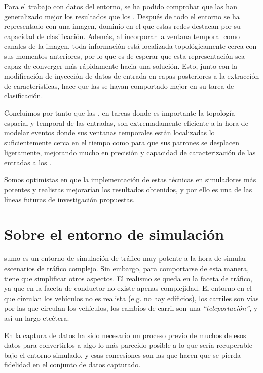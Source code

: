 Para el trabajo con datos del entorno, se ha podido comprobar que las  han generalizado mejor los resultados que los . Después de todo el entorno se ha representado con una imagen, dominio en el que estas redes destacan por su capacidad de clasificación. Además, al incorporar la ventana temporal como canales de la imagen, toda información está localizada topológicamente cerca con sus momentos anteriores, por lo que es de esperar que esta representación sea capaz de converger más rápidamente hacia una solución. Esto, junto con la modificación de inyección de datos de entrada en capas posteriores a la extracción de características, hace que las  se hayan comportado mejor en su tarea de clasificación.

Concluimos por tanto que las , en tareas donde es importante la topología espacial y temporal de las entradas, son extremadamente eficiente a la hora de modelar eventos donde sus ventanas temporales están localizadas lo suficientemente cerca en el tiempo como para que sus patrones se desplacen ligeramente, mejorando mucho en precisión y capacidad de caracterización de las entradas a los .

Somos optimistas en que la implementación de estas técnicas en simuladores más potentes y realistas mejorarían los resultados obtenidos, y por ello es una de las líneas futuras de investigación propuestas.

\section{Sobre el entorno de simulación}

\gls{sumo} es un entorno de simulación de tráfico muy potente a la hora de simular escenarios de tráfico complejo. Sin embargo, para comportarse de esta manera, tiene que simplificar otros aspectos. El realismo se queda en la faceta de tráfico, ya que en la faceta de conductor no existe apenas complejidad. El entorno en el que circulan los vehículos no es realista (e.g. no hay edificios), los carriles son vías por las que circulan los vehículos, los cambios de carril son una \textit{\enquote{teleportación}}, y así un largo etcétera.

En la captura de datos ha sido necesario un proceso previo de muchos de esos datos para convertirlos a algo lo más parecido posible a lo que sería recuperable bajo el entorno simulado, y esas concesiones son las que hacen que se pierda fidelidad en el conjunto de datos capturado.

